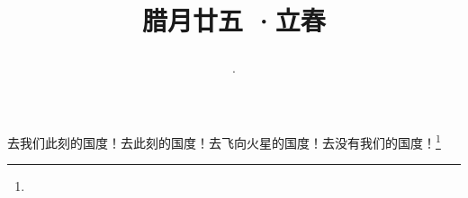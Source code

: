 \title{\date[d=4,m=2,y=2024][year:cn-y,年,month:cn,day:cn,日,·,weekday]·腊月廿五 ·立春}
去我们此刻的国度！去此刻的国度！去飞向火星的国度！去没有我们的国度！\footnote{ }

